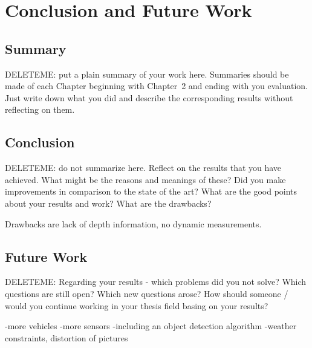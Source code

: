\chapter{Conclusion and Future Work}
\label{conclusion}
\section{Summary}
DELETEME: put a plain summary of your work here. Summaries should be made of each Chapter beginning with Chapter~2 and ending with you evaluation. Just write down what you did and describe the corresponding results without reflecting on them.

\section{Conclusion}
DELETEME: do not summarize here. Reflect on the results that you have achieved. What might be the reasons and meanings of these? Did you make improvements in comparison to the state of the art? What are the good points about your results and work? What are the drawbacks?

Drawbacks are lack of depth information, no dynamic measurements.

\section{Future Work}
DELETEME: Regarding your results - which problems did you not solve? Which questions are still open? Which new questions arose? How should someone / would you continue working in your thesis field basing on your results?

-more vehicles
-more sensors
-including an object detection algorithm
-weather constraints, distortion of pictures
